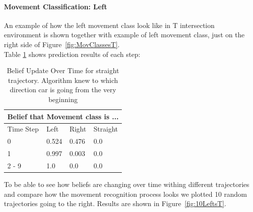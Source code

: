 \paragraph{Movement Classification: Left}

An example of how the left movement class look like in T intersection environment is shown together with example of left movement class, just on the right side of Figure~\ref{fig:MovClassesT}. \\

Table \ref{table:BelifLEftT} shows prediction results of each step:

\begin{table}[h!]
	\centering
	\begin{tabular}{ |p{1.5cm}||p{1.5cm}|p{1.5cm}|p{1.5cm}|}
		\hline
		\multicolumn{4}{|c|}{Belief that Movement class is ...} \\
		\hline
		Time Step & Left & Right & Straight \\
		\hline
		0 & 0.524 & 0.476 & 0.0 \\
		1 & 0.997 & 0.003 & 0.0 \\
		2 - 9 & 1.0   & 0.0   & 0.0 \\
		\hline
	\end{tabular}
	\caption{Belief Update Over Time for straight trajectory. Algorithm knew to which direction car is going from the very beginning}
	\label{table:BelifLEftT}
\end{table}



To be able to see how beliefs are changing over time withing different trajectories and compare how the movement recognition process looks we plotted 10 random trajectories going to the right. Results are shown in Figure~\ref{fig:10LeftsT}.

